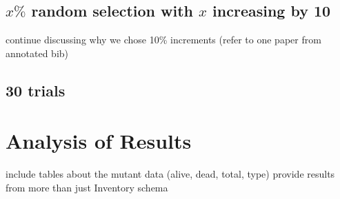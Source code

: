 \documentclass[conference]{IEEEtran}
\begin{document}
\subsection{$x\%$ random selection with $x$ increasing by 10}

continue discussing why we chose 10\% increments (refer to one paper from annotated bib)

\subsection{30 trials}


\vspace*{-0.25cm}
\section{Analysis of Results}

include tables about the mutant data (alive, dead, total, type)
provide results from more than just Inventory schema
\end{document}
